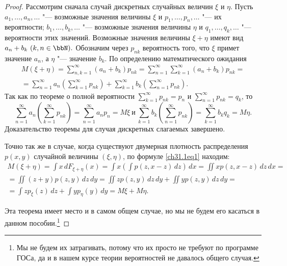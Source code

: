 \begin{proof}
Рассмотрим сначала случай дискретных случайных величин $\xi$ и $\eta$. Пусть $a_1,\dots,a_n,\dots$ "--- возможные значения величины $\xi$ и $p_1,\dots,p_n,\dots$ "--- их вероятности; $b_1,\dots,b_k,\dots$ "--- возможные значения величины $\eta$ и $q_1,\dots,q_k,\dots$ "--- вероятности этих значений. Возможные значения величины $\xi+\eta$ имеют вид $a_n+b_k\ (k,n\in\bbN).$ Обозначим через $p_{nk}$ вероятность того, что $\xi$ примет значение $a_n$, а $\eta$ "--- значение $b_k$. По определению математического ожидания
\begin{multline*}
M(\xi+\eta)=\sum\limits_{n,k=1}^{\infty} (a_n+b_k)p_{nk}=\sum\limits_{n=1}^{\infty}\sum\limits_{k=1}^{\infty} (a_n+b_k)p_{nk}=\\
=\sum\limits_{n=1}^{\infty} a_n \left(\sum\limits_{k=1}^{\infty}p_{nk}\right)+\sum\limits_{k=1}^{\infty} b_k \left(\sum\limits_{n=1}^{\infty}p_{nk}\right).
\end{multline*}
Так как по теореме о полной вероятности $\sum\limits_{k=1}^{\infty}p_{nk}=p_n$ и $\sum\limits_{n=1}^{\infty}p_{nk}=q_k$, то 
$$
\sum\limits_{n=1}^{\infty} a_n \left(\sum\limits_{k=1}^{\infty}p_{nk}\right) = \sum\limits_{n=1}^{\infty} a_n p_n = M\xi\ \text{и}\ \sum\limits_{k=1}^{\infty} b_k \left(\sum\limits_{n=1}^{\infty}p_{nk}\right)=\sum\limits_{k=1}^{\infty} b_k q_k = M\eta.
$$
Доказательство теоремы для случая дискретных слагаемых завершено.

Точно так же в случае, когда существуют двумерная плотность распределения $p(x,y)$ случайной величины $(\xi,\eta)$, по формуле \eqref{ch31.1eq1} находим:
\begin{multline*}
M(\xi+\eta)=\int x\,dF_{\xi+\eta}(x)=\int x \left(\int p(z,x-z)\,dz\right)\,dx=\iint xp(z,x-z)\,dz\,dx=\\=\iint (z+y) p(z,y)\,dz\,dy=\iint z p(z,y)\,dz\,dy + \iint y p(z,y)\,dz\,dy=\\=\int z p_\xi(z)\,dz + \int y p_\eta (y)\,dy= M\xi+M\eta.
\end{multline*}

Эта теорема имеет место и в самом общем случае, но мы не будем его касаться в данном пособии.\footnote{Мы не будем их затрагивать, потому что их просто не требуют по программе ГОСа, да и в нашем курсе теории вероятностей не давалось общего случая.}
\end{proof}

